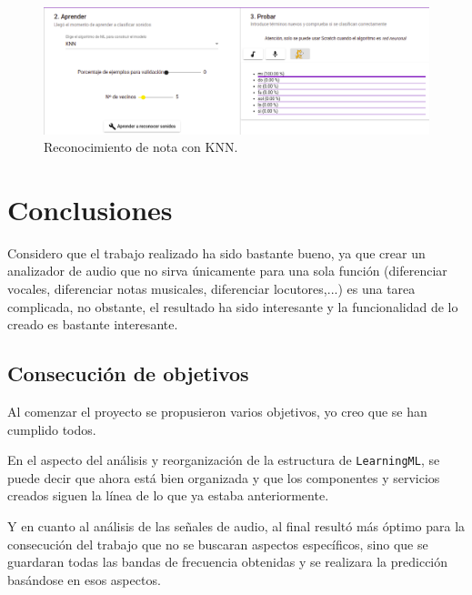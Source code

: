 \documentclass[a4paper, 12pt]{book}
\begin{document}
\begin{figure}
	\centering
	\includegraphics[width=12cm, keepaspectratio]{img/knn1.png}
	\caption{Reconocimiento de nota con KNN.}
	\label{fig:knn}
\end{figure}


\cleardoublepage
\chapter{Conclusiones}
\label{chap:conclusiones}

Considero que el trabajo realizado ha sido bastante bueno, ya que crear un analizador de audio que no sirva únicamente para una sola función (diferenciar vocales, diferenciar notas musicales, diferenciar locutores,...) es una tarea complicada, no obstante, el resultado ha sido interesante y la funcionalidad de lo creado es bastante interesante.

\section{Consecución de objetivos}
\label{sec:consecucion-objetivos}

Al comenzar el proyecto se propusieron varios objetivos, yo creo que se han cumplido todos.

En el aspecto del análisis y reorganización de la estructura de \texttt{LearningML}, se puede decir que ahora está bien organizada y que los componentes y servicios creados siguen la línea de lo que ya estaba anteriormente.

Y en cuanto al análisis de las señales de audio, al final resultó más óptimo para la consecución del trabajo que no se buscaran aspectos específicos, sino que se guardaran todas las bandas de frecuencia obtenidas y se realizara la predicción basándose en esos aspectos.
\end{document}
